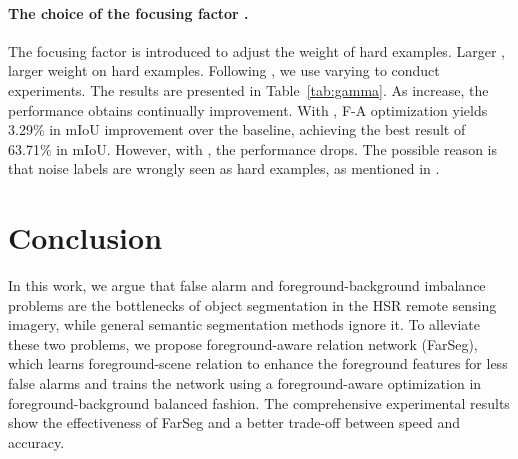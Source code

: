 \documentclass[10pt,twocolumn,letterpaper]{article}
\begin{document}
\paragraph{The choice of the focusing factor .}
The focusing factor  is introduced to adjust the weight of hard examples.
Larger , larger weight on hard examples.
Following \cite{lin2017focal}, we use varying  to conduct experiments.
The results are presented in Table~\ref{tab:gamma}.
As  increase, the performance obtains continually improvement.
With , F-A optimization yields 3.29\% in mIoU improvement over the baseline, achieving the best result of 63.71\% in mIoU.
However, with , the performance drops.
The possible reason is that noise labels are wrongly seen as hard examples, as mentioned in \cite{li2019gradient}.

\begin{table}[]
   \caption{mIoU (\%) on iSAID  set using varying  for F-A optimization.
      \label{tab:gamma}}
   \centering
   \renewcommand{\arraystretch}{1.4}
\end{table}




\section{Conclusion}
\label{sec:conc}
In this work, we argue that false alarm and foreground-background imbalance problems are the bottlenecks of object segmentation in the HSR remote sensing imagery, while general semantic segmentation methods ignore it.
To alleviate these two problems, we propose foreground-aware relation network (FarSeg), which learns foreground-scene relation to enhance the foreground features for less false alarms and trains the network using a foreground-aware optimization in foreground-background balanced fashion.
The comprehensive experimental results show the effectiveness of FarSeg and a better trade-off between speed and accuracy.


{\small
   
   
}
\end{document}
